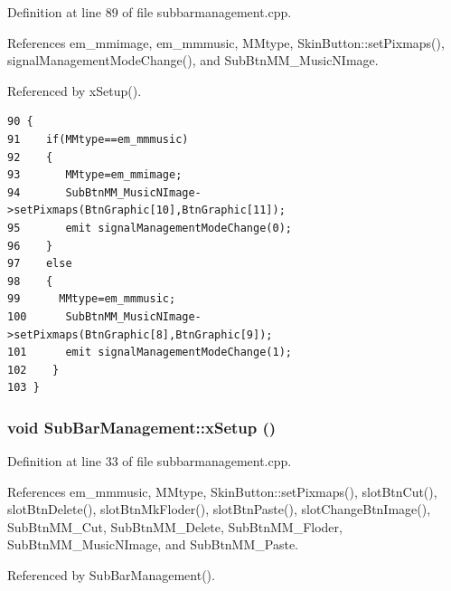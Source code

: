 Definition at line 89 of file subbarmanagement.cpp.

References em\_\-mmimage, em\_\-mmmusic, MMtype, Skin\-Button::set\-Pixmaps(), signal\-Management\-Mode\-Change(), and Sub\-Btn\-MM\_\-Music\-NImage.

Referenced by x\-Setup().



\footnotesize\begin{verbatim}90 {
91    if(MMtype==em_mmmusic)
92    {
93       MMtype=em_mmimage;
94       SubBtnMM_MusicNImage->setPixmaps(BtnGraphic[10],BtnGraphic[11]);
95       emit signalManagementModeChange(0);
96    }
97    else
98    {
99      MMtype=em_mmmusic;
100      SubBtnMM_MusicNImage->setPixmaps(BtnGraphic[8],BtnGraphic[9]);
101      emit signalManagementModeChange(1);
102    }
103 }
\end{verbatim}\normalsize 
{}
\subsubsection{\setlength{\rightskip}{0pt plus 5cm}void Sub\-Bar\-Management::x\-Setup ()}\label{classSubBarManagement_SubBarManagementa2}




Definition at line 33 of file subbarmanagement.cpp.

References em\_\-mmmusic, MMtype, Skin\-Button::set\-Pixmaps(), slot\-Btn\-Cut(), slot\-Btn\-Delete(), slot\-Btn\-Mk\-Floder(), slot\-Btn\-Paste(), slot\-Change\-Btn\-Image(), Sub\-Btn\-MM\_\-Cut, Sub\-Btn\-MM\_\-Delete, Sub\-Btn\-MM\_\-Floder, Sub\-Btn\-MM\_\-Music\-NImage, and Sub\-Btn\-MM\_\-Paste.

Referenced by Sub\-Bar\-Management().




